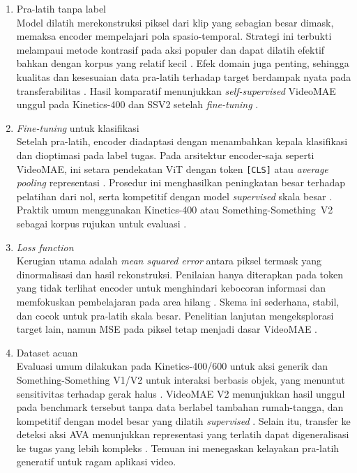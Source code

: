 \begin{enumerate}
\item Pra-latih tanpa label\\
Model dilatih merekonstruksi piksel dari klip yang sebagian besar dimask, memaksa encoder mempelajari pola spasio-temporal. Strategi ini terbukti melampaui metode kontrasif pada aksi populer dan dapat dilatih efektif bahkan dengan korpus yang relatif kecil \cite{Tong2022VideoMAE}. Efek domain juga penting, sehingga kualitas dan kesesuaian data pra-latih terhadap target berdampak nyata pada transferabilitas \cite{Tong2022VideoMAE}. Hasil komparatif menunjukkan \textit{self-supervised} VideoMAE unggul pada Kinetics-400 dan SSV2 setelah \textit{fine-tuning} \cite{Tong2022VideoMAE}.

\item \textit{Fine-tuning} untuk klasifikasi\\
Setelah pra-latih, encoder diadaptasi dengan menambahkan kepala klasifikasi dan dioptimasi pada label tugas. Pada arsitektur encoder-saja seperti VideoMAE, ini setara pendekatan ViT dengan token \texttt{[CLS]} atau \textit{average pooling} representasi \cite{Dosovitskiy2021}. Prosedur ini menghasilkan peningkatan besar terhadap pelatihan dari nol, serta kompetitif dengan model \textit{supervised} skala besar \cite{Wang2023VideoMAEv2}. Praktik umum menggunakan Kinetics-400 atau Something-Something~V2 sebagai korpus rujukan untuk evaluasi \cite{Wang2023VideoMAEv2}.

\item \textit{Loss function}\\
Kerugian utama adalah \textit{mean squared error} antara piksel termask yang dinormalisasi dan hasil rekonstruksi. Penilaian hanya diterapkan pada token yang tidak terlihat encoder untuk menghindari kebocoran informasi dan memfokuskan pembelajaran pada area hilang \cite{Tong2022VideoMAE,Wang2023VideoMAEv2}. Skema ini sederhana, stabil, dan cocok untuk pra-latih skala besar. Penelitian lanjutan mengeksplorasi target lain, namun MSE pada piksel tetap menjadi dasar VideoMAE \cite{Tong2022VideoMAE}.

\item Dataset acuan\\
Evaluasi umum dilakukan pada Kinetics-400/600 untuk aksi generik dan Something-Something V1/V2 untuk interaksi berbasis objek, yang menuntut sensitivitas terhadap gerak halus \cite{Wang2023VideoMAEv2}. VideoMAE V2 menunjukkan hasil unggul pada benchmark tersebut tanpa data berlabel tambahan rumah-tangga, dan kompetitif dengan model besar yang dilatih \textit{supervised} \cite{Wang2023VideoMAEv2}. Selain itu, transfer ke deteksi aksi AVA menunjukkan representasi yang terlatih dapat digeneralisasi ke tugas yang lebih kompleks \cite{Tong2022VideoMAE}. Temuan ini menegaskan kelayakan pra-latih generatif untuk ragam aplikasi video.
\end{enumerate}

